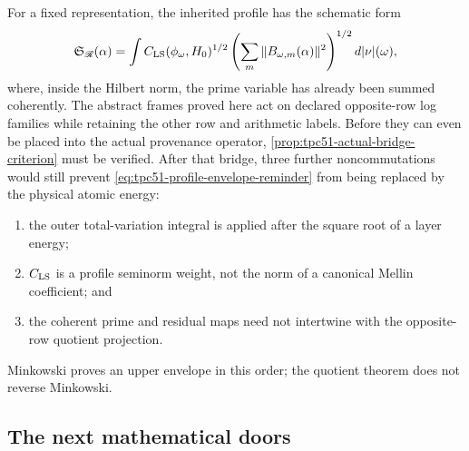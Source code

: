For a fixed representation, the inherited profile has the schematic
form
\begin{equation}
 \mathfrak S_{\mathscr R}(\alpha)
 =\int C_{\rm LS}(\phi_\omega,H_0)^{1/2}
 \left(\sum_m\|B_{\omega,m}(\alpha)\|^2\right)^{1/2}
 d|\nu|(\omega),
 \label{eq:tpc51-profile-envelope-reminder}
\end{equation}
where, inside the Hilbert norm, the prime variable has already been
summed coherently.  The abstract frames proved here act on declared
opposite-row log families while retaining the other row and arithmetic
labels.  Before they can even be placed into the actual provenance
operator, \cref{prop:tpc51-actual-bridge-criterion} must be verified.
After that bridge, three further noncommutations would still prevent
\eqref{eq:tpc51-profile-envelope-reminder} from being replaced by the
physical atomic energy:
\begin{enumerate}[label=\textup{(\roman*)},leftmargin=2.6em]
 \item the outer total-variation integral is applied after the square
       root of a layer energy;
 \item \(C_{\rm LS}\) is a profile seminorm weight, not the norm of a
       canonical Mellin coefficient; and
 \item the coherent prime and residual maps need not intertwine with
       the opposite-row quotient projection.
\end{enumerate}
Minkowski proves an upper envelope in this order; the quotient theorem
does not reverse Minkowski.

\subsection{The next mathematical doors}

